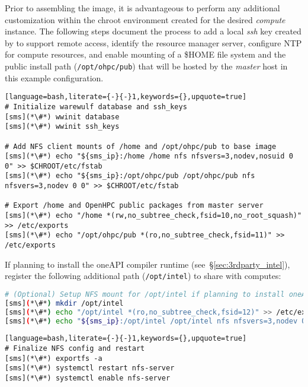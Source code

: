 Prior to assembling the image, it is advantageous to perform any additional
customization within the chroot environment created for the desired {\em
 compute} instance. The following steps document the process to add a local
{\em ssh} key created by \Warewulf{} to support remote access, identify the
resource manager server, configure NTP for compute resources, and enable \NFS{}
mounting of a \$HOME file system and the public \OHPC{} install path
(\texttt{/opt/ohpc/pub}) that will be hosted by the {\em master} host in this
example configuration.

\vspace*{0.15cm}
\begin{lstlisting}[language=bash,literate={-}{-}1,keywords={},upquote=true]
# Initialize warewulf database and ssh_keys
[sms](*\#*) wwinit database
[sms](*\#*) wwinit ssh_keys

# Add NFS client mounts of /home and /opt/ohpc/pub to base image
[sms](*\#*) echo "${sms_ip}:/home /home nfs nfsvers=3,nodev,nosuid 0 0" >> $CHROOT/etc/fstab
[sms](*\#*) echo "${sms_ip}:/opt/ohpc/pub /opt/ohpc/pub nfs nfsvers=3,nodev 0 0" >> $CHROOT/etc/fstab

# Export /home and OpenHPC public packages from master server
[sms](*\#*) echo "/home *(rw,no_subtree_check,fsid=10,no_root_squash)" >> /etc/exports
[sms](*\#*) echo "/opt/ohpc/pub *(ro,no_subtree_check,fsid=11)" >> /etc/exports
\end{lstlisting}

\noindent If planning to install the \IntelR{} oneAPI compiler runtime
(see~\S\ref{sec:3rdparty_intel}), register the
following additional path (\texttt{/opt/intel}) to share with computes:

\begin{lstlisting}[language=bash,keywords={},upquote=true,keepspaces]
# (Optional) Setup NFS mount for /opt/intel if planning to install oneAPI packages
[sms](*\#*) mkdir /opt/intel
[sms](*\#*) echo "/opt/intel *(ro,no_subtree_check,fsid=12)" >> /etc/exports
[sms](*\#*) echo "${sms_ip}:/opt/intel /opt/intel nfs nfsvers=3,nodev 0 0" >> $CHROOT/etc/fstab
\end{lstlisting}
\begin{lstlisting}[language=bash,literate={-}{-}1,keywords={},upquote=true]
# Finalize NFS config and restart
[sms](*\#*) exportfs -a
[sms](*\#*) systemctl restart nfs-server
[sms](*\#*) systemctl enable nfs-server
\end{lstlisting}
